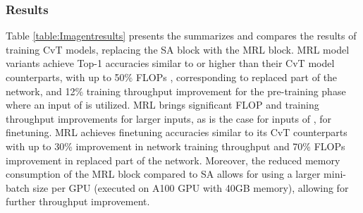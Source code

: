 \documentclass{article}
\begin{document}
\subsubsection{Results}

Table \ref{table:Imagentresults} presents the summarizes and compares the results of training CvT models, replacing the SA block with the MRL block. MRL model variants achieve Top-1 accuracies similar to or higher than their CvT model counterparts, with up to 50\% FLOPs , corresponding to replaced part of the network, and 12\% training throughput improvement for the pre-training phase where an input of  is utilized. MRL brings significant FLOP and training throughput improvements for larger inputs, as is the case for inputs of , for finetuning. MRL achieves finetuning accuracies similar to its CvT counterparts with up to 30\% improvement in network training throughput and 70\% FLOPs improvement in replaced part of the network. Moreover, the reduced memory consumption of the MRL block compared to SA allows for using a larger mini-batch size per GPU (executed on A100 GPU with 40GB memory), allowing for further throughput improvement. 
\end{document}
